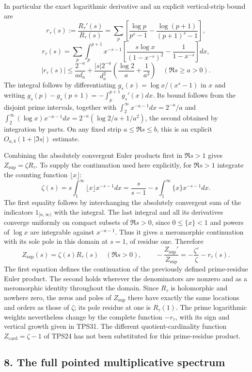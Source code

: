 \documentclass[
  10pt,
]{article}
\begin{document}
In particular the exact logarithmic derivative and an explicit
vertical-strip bound are \[
\boxed{r_\tau(s):=\frac{R_\tau'(s)}{R_\tau(s)}
=\sum_p\left[\frac{\log p}{p^s-1}
-\frac{\log(p+1)}{(p+1)^s-1}\right],}
\] \[
r_\tau(s)=\sum_p\int_p^{p+1}x^{-s-1}
\left[\frac{s\log x}{(1-x^{-s})^2}-\frac1{1-x^{-s}}\right]dx,
\] \[
\boxed{|r_\tau(s)|\le
\frac{2^{-a}}{a d_a}
+\frac{|s|2^{-a}}{d_a^2}\left(\frac{\log2}{a}+\frac1{a^2}\right)
\quad(\Re s\ge a>0).}
\tag{TPS31}
\] The integral follows by differentiating \(g_s(x)=\log x/(x^s-1)\) in
\(x\) and writing \(g_s(p)-g_s(p+1)=-\int_p^{p+1}g_s'(x)dx\). Its bound
follows from the disjoint prime intervals, together with
\(\int_2^\infty x^{-a-1}dx=2^{-a}/a\) and
\(\int_2^\infty(\log x)x^{-a-1}dx=2^{-a}(\log2/a+1/a^2)\), the second
obtained by integration by parts. On any fixed strip \(a\le\Re s\le b\),
this is an explicit \(O_{a,b}(1+|\Im s|)\) estimate.

Combining the absolutely convergent Euler products first in \(\Re s>1\)
gives \(Z_{\mathrm{sup}}=\zeta R_\tau\). To supply the continuation used
here explicitly, for \(\Re s>1\) integrate the counting function
\(\lfloor x\rfloor\): \[
\zeta(s)=s\int_1^\infty\lfloor x\rfloor x^{-s-1}dx
=\frac{s}{s-1}-s\int_1^\infty\{x\}x^{-s-1}dx.
\] The first equality follows by interchanging the absolutely convergent
sum of the indicators \(1_{[n,\infty)}\) with the integral. The last
integral and all its derivatives converge uniformly on compact subsets
of \(\Re s>0\), since \(0\le\{x\}<1\) and powers of \(\log x\) are
integrable against \(x^{-a-1}\). Thus it gives a meromorphic
continuation with its sole pole in this domain at \(s=1\), of residue
one. Therefore \[
\boxed{Z_{\mathrm{sup}}(s)=\zeta(s)R_\tau(s)\quad(\Re s>0),
\qquad
-\frac{Z_{\mathrm{sup}}'}{Z_{\mathrm{sup}}}
=-\frac{\zeta'}{\zeta}-r_\tau(s).}
\tag{TPS32}
\] The first equation defines the continuation of the previously defined
prime-residue Euler product. The second holds wherever the denominators
are nonzero and as a meromorphic identity throughout the domain. Since
\(R_\tau\) is holomorphic and nowhere zero, the zeros and poles of
\(Z_{\mathrm{sup}}\) there have exactly the same locations and orders as
those of \(\zeta\); its pole residue at one is \(R_\tau(1)\). The prime
logarithmic weights nevertheless change by the complete function
\(-r_\tau\), with its sign and vertical growth given in TPS31. The
different quotient-cardinality function \(Z_{\mathrm{card}}=\zeta-1\) of
TPS24 has not been substituted for this prime-residue product.

\subsection{8. The full pointed multiplicative
spectrum}\label{the-full-pointed-multiplicative-spectrum}
\end{document}
